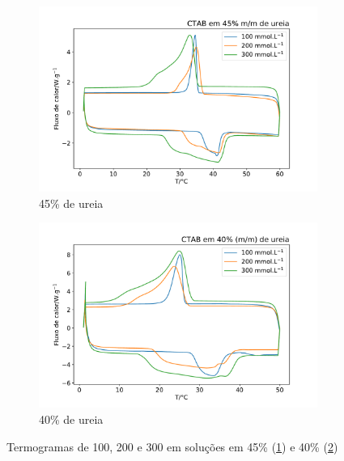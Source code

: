 	\begin{figure}[h]
		\begin{subfigure}[t]{0.45\textwidth}
			\centering
			\includegraphics[width=\textwidth]{./imagens/dsc/CTAB_45p}
			\caption{45\% de ureia}
			\label{fig:DSC_CTAB_UR45}
		\end{subfigure} \qquad %
		\begin{subfigure}[t]{0.45\textwidth}
			\centering
			\includegraphics[width=\textwidth]{./imagens/dsc/CTAB_40p}
			\caption{40\% de ureia}
			\label{fig:DSC_CTAB_UR40}
		\end{subfigure}
		\caption{Termogramas de \CTAB{} 100, 200 e 300 \mM{} em soluções em 45\% (\ref{fig:DSC_CTAB_UR45}) e 40\% (\ref{fig:DSC_CTAB_UR40})}
		\label{fig:DSC_CTAB_UR40-45}
	\end{figure}

